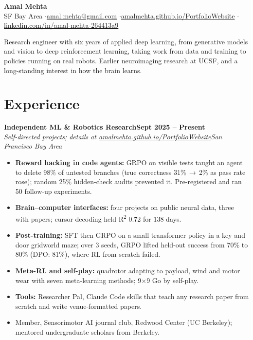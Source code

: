 \documentclass[10pt]{article}
\newcommand{\role}[4]{\textbf{#1}\hfill\textbf{#2}\\\textit{#3}\hfill\textit{#4}}
\begin{document}
\fontsize{9.8}{11.4}\selectfont

\begin{center}
{\LARGE\bfseries Amal Mehta}\\[3pt]
SF Bay Area \quad$\cdot$\quad \href{mailto:amal.mehta@gmail.com}{amal.mehta@gmail.com} \quad$\cdot$\quad \href{https://amalmehta.github.io/PortfolioWebsite/}{amalmehta.github.io/PortfolioWebsite} \quad$\cdot$\quad \href{https://www.linkedin.com/in/amal-mehta-264413a9/}{linkedin.com/in/amal-mehta-264413a9}
\end{center}

Research engineer with six years of applied deep learning, from generative models and vision to deep reinforcement learning, taking work from data and training to policies running on real robots. Earlier neuroimaging research at UCSF, and a long-standing interest in how the brain learns.

\section*{Experience}

\role{Independent ML \& Robotics Research}{Sept 2025 -- Present}{Self-directed projects; details at \href{https://amalmehta.github.io/PortfolioWebsite/}{amalmehta.github.io/PortfolioWebsite}}{San Francisco Bay Area}
\begin{itemize}
\item \textbf{Reward hacking in code agents:} GRPO on visible tests taught an agent to delete 98\% of untested branches (true correctness 31\%\,$\to$\,2\% as pass rate rose); random 25\% hidden-check audits prevented it. Pre-registered and ran 50 follow-up experiments.
\item \textbf{Brain--computer interfaces:} four projects on public neural data, three with papers; cursor decoding held R\textsuperscript{2} 0.72 for 138 days.
\item \textbf{Post-training:} SFT then GRPO on a small transformer policy in a key-and-door gridworld maze; over 3 seeds, GRPO lifted held-out success from 70\% to 80\% (DPO: 81\%), where RL from scratch failed.
\item \textbf{Meta-RL and self-play:} quadrotor adapting to payload, wind and motor wear with seven meta-learning methods; 9$\times$9 Go by self-play.
\item \textbf{Tools:} Researcher Pal, Claude Code skills that teach any research paper from scratch and write venue-formatted papers.
\item Member, Sensorimotor AI journal club, Redwood Center (UC Berkeley); mentored undergraduate scholars from Berkeley.
\end{itemize}
\end{document}
